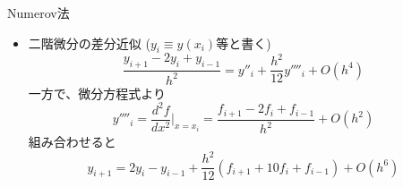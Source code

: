 \begin{frame}[t,fragile]{Numerov法}
  \begin{itemize}
    \setlength{\itemsep}{1em}
  \item 二階微分の差分近似 ($y_i \equiv y(x_i)$等と書く)
    \[
    \frac{y_{i+1} - 2 y_i + y_{i-1}}{h^2} = y''_{i} + \frac{h^2}{12} y''''_{i} + O(h^4)
    \]
  一方で、微分方程式より
    \[
    y''''_i = \frac{d^2f}{dx^2}\Big|_{x=x_i} = \frac{f_{i+1}-2f_i+f_{i-1}}{h^2} + O(h^2)
    \]
    組み合わせると
    \[
    y_{i+1} = 2y_i - y_{i-1} + \frac{h^2}{12} (f_{i+1} + 10f_{i} + f_{i-1}) + O(h^6)
    \]
  \end{itemize}
\end{frame}
